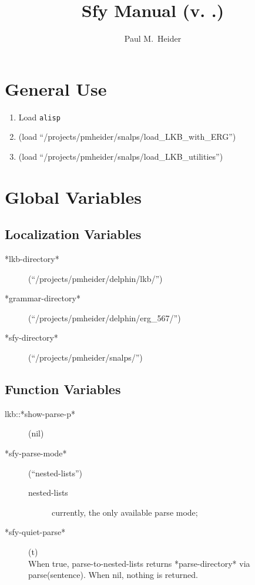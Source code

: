 \documentclass{article}
\title{Sfy Manual (v. \themajorversion.\theminorversion)}
\author{Paul M.\ Heider}
\begin{document}
\maketitle

\section{General Use}

  \begin{enumerate}
    \item Load \texttt{alisp}
    \item (load ``/projects/pmheider/snalps/load\_LKB\_with\_ERG'')
    \item (load ``/projects/pmheider/snalps/load\_LKB\_utilities'')

  \end{enumerate}

\section{Global Variables}

\subsection{Localization Variables}

  \begin{description}
    \item[*lkb-directory*] (``/projects/pmheider/delphin/lkb/'')
    \item[*grammar-directory*] (``/projects/pmheider/delphin/erg\_567/'')
    \item[*sfy-directory*] (``/projects/pmheider/snalps/'')
  \end{description}

\subsection{Function Variables}

  \begin{description}
    \item[lkb::*show-parse-p*] (nil)
    \item[*sfy-parse-mode*] (``nested-lists'')
      \begin{description}
        \item[nested-lists] currently, the only available parse mode;
      \end{description}
    \item[*sfy-quiet-parse*] (t) \\
      When true, parse-to-nested-lists returns *parse-directory* via parse(sentence).  When nil, nothing is returned.
  \end{description}
\end{document}
